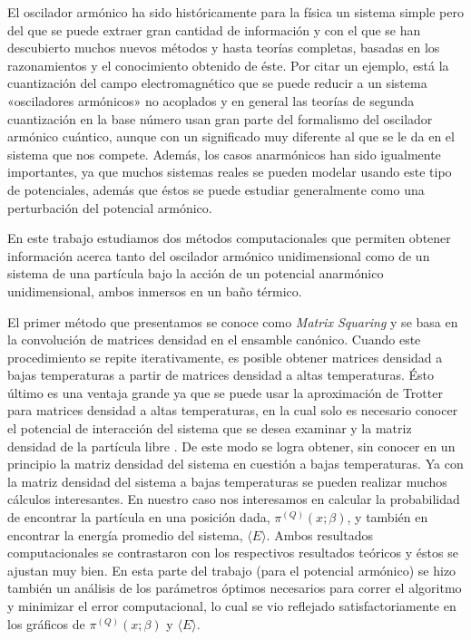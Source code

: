 \documentclass[%
 reprint,
 amsmath,amssymb,
 aps,
 pra,
]{revtex4-2}
\begin{document}
El oscilador armónico ha sido históricamente para la física un sistema simple pero del que se puede extraer gran cantidad de información y con el que se han descubierto muchos nuevos métodos y hasta teorías completas, basadas en los razonamientos y el conocimiento obtenido de éste. Por citar un ejemplo, está la cuantización del campo electromagnético que se puede reducir a un sistema «osciladores armónicos» no acoplados y en general las teorías de segunda cuantización en la base número usan gran parte del formalismo del oscilador armónico cuántico, aunque con un significado muy diferente al que se le da en el sistema que nos compete\cite{Grynberg2010,Schwartz2013}. Además, los casos anarmónicos han sido igualmente importantes, ya que muchos sistemas reales se pueden modelar usando este tipo de potenciales, además que éstos se puede estudiar generalmente como una perturbación del potencial armónico. 

En este trabajo estudiamos dos métodos computacionales que permiten obtener información acerca tanto del oscilador armónico unidimensional como de un sistema de una partícula bajo la acción de un potencial anarmónico unidimensional, ambos inmersos en un baño térmico.

El primer método que presentamos se conoce como \textit{Matrix Squaring} y se basa en la convolución de matrices densidad en el ensamble canónico. Cuando este procedimiento se repite iterativamente, es posible obtener matrices densidad a bajas temperaturas a partir de matrices densidad a altas temperaturas. Ésto último es una ventaja grande ya que se puede usar la aproximación de Trotter para matrices densidad a altas temperaturas, en la cual solo es necesario conocer el potencial de interacción del sistema que se desea examinar y la matriz densidad de la partícula libre \cite{WernerKrauth2006}. De este modo se logra obtener, sin conocer en un principio la matriz densidad del sistema en cuestión a bajas temperaturas. Ya con la matriz densidad del sistema a bajas temperaturas se pueden realizar muchos cálculos interesantes. En nuestro caso nos interesamos en calcular la probabilidad de encontrar la partícula en una posición dada, $\pi^{(Q)}(x;\beta)$, y también en encontrar la energía promedio del sistema, $\langle E \rangle$. Ambos resultados computacionales se contrastaron con los respectivos resultados teóricos y éstos se ajustan muy bien. En esta parte del trabajo (para el potencial armónico) se hizo también un análisis de los parámetros óptimos necesarios para correr el algoritmo y minimizar el error computacional, lo cual se vio reflejado satisfactoriamente en los gráficos de $\pi^{(Q)}(x;\beta)$ y $\langle E \rangle$.
\end{document}
